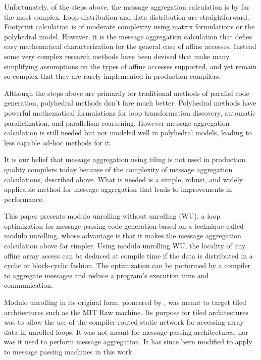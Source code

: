 Unfortunately, of the steps above, the message aggregation calculation is by far the most complex. Loop distribution and data distribution are straightforward. Footprint calculation is of moderate complexity using matrix formulations or the polyhedral model. However, it is the message aggregation calculation that defies easy mathematical characterization for the general case of affine accesses. Instead some very complex research methods \cite{goumas2006message, xue1997communication} have been devised that make many simplifying assumptions on the types of affine accesses supported, and yet remain so complex that they are rarely implemented in production compilers.

Although the steps above are primarily for traditional methods of parallel code generation, polyhedral methods don't fare much better. Polyhedral methods have powerful mathematical formulations for loop transformation discovery, automatic parallelization, and parallelism coarsening. However message aggregation calculation is still needed but not modeled well in polyhedral models, leading to less capable ad-hoc methods for it.

It is our belief that message aggregation using tiling is not used in production quality compilers today because of the complexity of message aggregation calculations, described above. What is needed is a simple, robust, and widely applicable method for message aggregation that leads to improvements in performance. 

This paper presents modulo unrolling without unrolling (WU), a loop optimization for message passing code generation based on a technique called modulo unrolling, whose advantage is that it makes the message aggregation calculation above far simpler. Using modulo unrolling WU, the locality of any affine array access can be deduced at compile time if the data is distributed in a cyclic or block-cyclic fashion. The optimization can be performed by a compiler to aggregate messages and reduce a program's execution time and communication. 

Modulo unrolling in its original form, pioneered by \cite{barua1999maps}, was meant to target tiled architectures such as the MIT Raw machine. Its purpose for tiled architectures was to allow the use of the compiler-routed static network for accessing array data in unrolled loops. It was not meant for message passing architectures, nor was it used to perform message aggregation. It has since been modified to apply to message passing machines in this work. 

